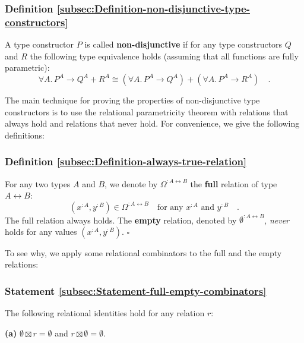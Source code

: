 \subsubsection{Definition \label{subsec:Definition-non-disjunctive-type-constructors}\ref{subsec:Definition-non-disjunctive-type-constructors}}

A type constructor $P$ is called \textbf{non-disjunctive}
if for any type constructors $Q$ and $R$ the following type equivalence
holds (assuming that all functions are fully parametric):
\begin{equation}
\forall A.\,P^{A}\rightarrow Q^{A}+R^{A}\cong(\forall A.\,P^{A}\rightarrow Q^{A})+(\forall A.\,P^{A}\rightarrow R^{A})\quad.\label{eq:non-disjunctive-type-equivalence}
\end{equation}

The main technique for proving the properties of non-disjunctive type
constructors is to use the relational parametricity theorem with relations
that always hold and relations that never hold. For convenience, we
give the following definitions:

\subsubsection{Definition \label{subsec:Definition-always-true-relation}\ref{subsec:Definition-always-true-relation}}

For any two types $A$ and $B$, we denote by $\Omega^{:A\leftrightarrow B}$
the \textbf{full} relation of type $A\leftrightarrow B$:
\[
(x^{:A},y^{:B})\in\Omega^{:A\leftrightarrow B}\quad\text{for any }x^{:A}\text{ and }y^{:B}\quad.
\]
The full relation always holds. The \textbf{empty} relation,
denoted by $\emptyset^{:A\leftrightarrow B}$, \emph{never} holds
for any values $(x^{:A},y^{:B})$. $\square$

To see why, we apply some relational combinators to the full and the
empty relations:

\subsubsection{Statement \label{subsec:Statement-full-empty-combinators}\ref{subsec:Statement-full-empty-combinators}}

The following relational identities hold for any relation $r$:

\textbf{(a)} $\emptyset\boxtimes r=\emptyset$ and $r\boxtimes\emptyset=\emptyset$.

